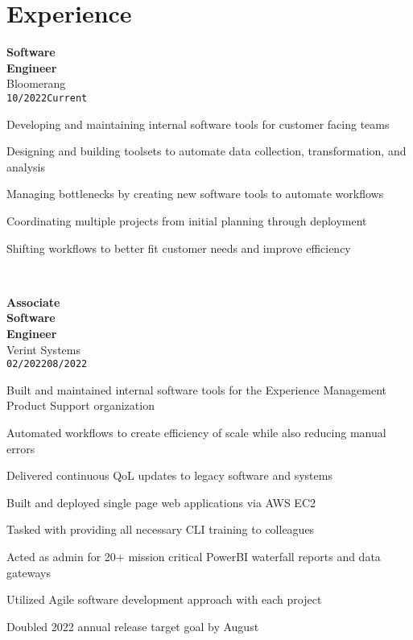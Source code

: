 \documentclass[10pt]{article}
\newenvironment{itemize*}%
  {\begin{itemize}[leftmargin=*,label=\faChevronRight]%
    \setlength{\itemsep}{0pt}%
    \setlength{\parskip}{0pt}%
    \setlength{\parsep}{0pt}}%
  {\end{itemize}}
\newcommand\workexp[5]{
    \begin{minipage}[t]{0.215\textwidth}
            \raggedleft
                \textbf{\fontsize{13}{10}\selectfont #1}\\ 
                #2\\
                \small\texttt{#3}\textendash \texttt{#4}
    \end{minipage}\hspace*{5pt}%
    \begin{minipage}[t]{0.75\textwidth}
        \raggedright
        \fontsize{10}{10}\selectfont#5
    \end{minipage}
}
\begin{document}
\section*{Experience}
\vspace*{-10pt}\workexp{Software\\ Engineer}{Bloomerang}{10/2022}{Current}{%
    \begin{itemize*}
        \item Developing and maintaining internal software tools for customer facing teams
        \item Designing and building toolsets to automate data collection, transformation, and analysis
        \item Managing bottlenecks by creating new software tools to automate workflows
        \item Coordinating multiple projects from initial planning through deployment
        \item Shifting workflows to better fit customer needs and improve efficiency
    \end{itemize*}%
}
\vspace*{10pt}\\
\workexp{Associate\\ Software\\ Engineer}{Verint Systems}{02/2022}{08/2022}{%
\begin{itemize*}
    \item Built and maintained internal software tools for the Experience Management Product Support organization
    \item Automated workflows to create efficiency of scale while also reducing manual errors
    \item Delivered continuous QoL updates to legacy software and systems
    \item Built and deployed single page web applications via AWS EC2
    \item Tasked with providing all necessary CLI training to colleagues
    \item Acted as admin for 20+ mission critical PowerBI waterfall reports and data gateways
    \item Utilized Agile software development approach with each project
    \item Doubled 2022 annual release target goal by August
\end{itemize*}%
}
\vspace*{10pt}\\
\end{document}
